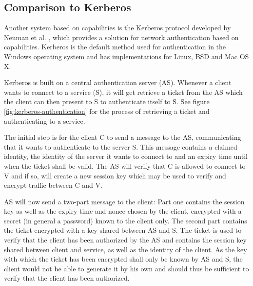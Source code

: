 \subsection{Comparison to Kerberos}
\label{sec:kerberos}

Another system based on capabilities is the Kerberos protocol developed by Neuman et al. \cite{neuman1994kerberos,neuman2005rfc}, which provides a solution for network authentication based on capabilities.
Kerberos is the default method used for authentication in the Windows operating system and has implementations for Linux, BSD and Mac OS X.

Kerberos is built on a central authentication server (AS).
Whenever a client wants to connect to a service (S), it will get retrieve a ticket from the AS which the client can then present to S to authenticate itself to S.
See figure \ref{fig:kerberos-authentication} for the process of retrieving a ticket and authenticating to a service.

The initial step is for the client C to send a message to the AS, communicating that it wants to authenticate to the server S.
This message contains a claimed identity, the identity of the server it wants to connect to and an expiry time until when the ticket shall be valid.
The AS will verify that C is allowed to connect to V and if so, will create a new session key which may be used to verify and encrypt traffic between C and V.

AS will now send a two-part message to the client:
Part one contains the session key as well as the expiry time and nonce chosen by the client, encrypted with a secret (in general a password) known to the client only.
The second part contains the ticket encrypted with a key shared between AS and S.
The ticket is used to verify that the client has been authorized by the AS and contains the session key shared between client and service, as well as the identity of the client.
As the key with which the ticket has been encrypted shall only be known by AS and S, the client would not be able to generate it by his own and should thus be sufficient to verify that the client has been authorized.

